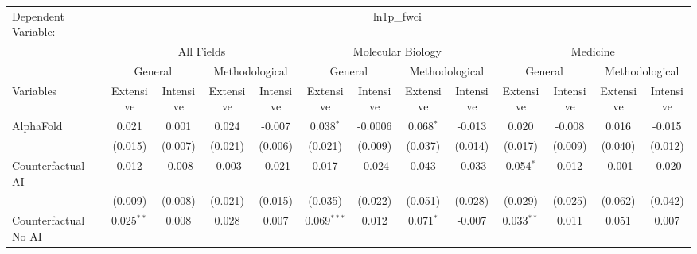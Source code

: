 \begingroup
\centering
\begin{tabular}{lcccccccccccc}
   \tabularnewline \midrule \midrule
   Dependent Variable: & \multicolumn{12}{c}{ln1p\_fwci}\\
 & \multicolumn{4}{c}{All Fields} & \multicolumn{4}{c}{Molecular Biology} & \multicolumn{4}{c}{Medicine} \\
\cmidrule(lr){2-5} \cmidrule(lr){6-9} \cmidrule(lr){10-13}
 & \multicolumn{2}{c}{General} & \multicolumn{2}{c}{Methodological} & \multicolumn{2}{c}{General} & \multicolumn{2}{c}{Methodological} & \multicolumn{2}{c}{General} & \multicolumn{2}{c}{Methodological} \\
\cmidrule(lr){2-3} \cmidrule(lr){4-5} \cmidrule(lr){6-7} \cmidrule(lr){8-9} \cmidrule(lr){10-11} \cmidrule(lr){12-13}
Variables & \multicolumn{1}{c}{Extensive} & \multicolumn{1}{c}{Intensive} & \multicolumn{1}{c}{Extensive} & \multicolumn{1}{c}{Intensive} & \multicolumn{1}{c}{Extensive} & \multicolumn{1}{c}{Intensive} & \multicolumn{1}{c}{Extensive} & \multicolumn{1}{c}{Intensive} & \multicolumn{1}{c}{Extensive} & \multicolumn{1}{c}{Intensive} & \multicolumn{1}{c}{Extensive} & \multicolumn{1}{c}{Intensive} \\
\cmidrule(lr){1-1}\cmidrule(lr){2-2} \cmidrule(lr){3-3} \cmidrule(lr){4-4} \cmidrule(lr){5-5} \cmidrule(lr){6-6} \cmidrule(lr){7-7} \cmidrule(lr){8-8} \cmidrule(lr){9-9} \cmidrule(lr){10-10} \cmidrule(lr){11-11} \cmidrule(lr){12-12} \cmidrule(lr){13-13}
   AlphaFold                                & 0.021        & 0.001   & 0.024   & -0.007  & 0.038$^{*}$   & -0.0006 & 0.068$^{*}$ & -0.013  & 0.020        & -0.008        & 0.016   & -0.015\\   
                                            & (0.015)      & (0.007) & (0.021) & (0.006) & (0.021)       & (0.009) & (0.037)     & (0.014) & (0.017)      & (0.009)       & (0.040) & (0.012)\\   
   Counterfactual AI                        & 0.012        & -0.008  & -0.003  & -0.021  & 0.017         & -0.024  & 0.043       & -0.033  & 0.054$^{*}$  & 0.012         & -0.001  & -0.020\\   
                                            & (0.009)      & (0.008) & (0.021) & (0.015) & (0.035)       & (0.022) & (0.051)     & (0.028) & (0.029)      & (0.025)       & (0.062) & (0.042)\\   
   Counterfactual No AI                     & 0.025$^{**}$ & 0.008   & 0.028   & 0.007   & 0.069$^{***}$ & 0.012   & 0.071$^{*}$ & -0.007  & 0.033$^{**}$ & 0.011         & 0.051   & 0.007\\   

\end{tabular}
